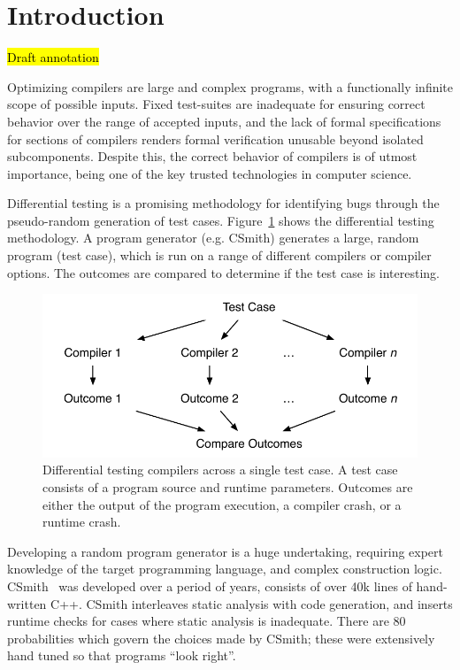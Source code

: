 \section{Introduction}\label{sec:intro}

\hl{Draft annotation}

\noindent
Optimizing compilers are large and complex programs, with a functionally infinite scope of possible inputs. Fixed test-suites are inadequate for ensuring correct behavior over the range of accepted inputs, and the lack of formal specifications for sections of compilers renders formal verification unusable beyond isolated subcomponents. Despite this, the correct behavior of compilers is of utmost importance, being one of the key trusted technologies in computer science.

Differential testing is a promising methodology for identifying bugs through the pseudo-random generation of test cases. Figure~\ref{fig:difftest} shows the differential testing methodology. A program generator (e.g. CSmith) generates a large, random program (test case), which is run on a range of different compilers or compiler options. The outcomes are compared to determine if the test case is interesting.

\begin{figure}
	\centering
	\includegraphics[width=.9\columnwidth]{img/difftest} %
	\caption{%
		Differential testing compilers across a single test case. A test case consists of a program source and runtime parameters. Outcomes are either the output of the program execution, a compiler crash, or a runtime crash.%
	}%
	\label{fig:difftest}
\end{figure}

Developing a random program generator is a huge undertaking, requiring expert knowledge of the target programming language, and complex construction logic. CSmith~\cite{Yang2011} was developed over a period of years, consists of over 40k lines of hand-written C++. CSmith interleaves static analysis with code generation, and inserts runtime checks for cases where static analysis is inadequate. There are 80 probabilities which govern the choices made by CSmith; these were extensively hand tuned so that programs ``look right''.

